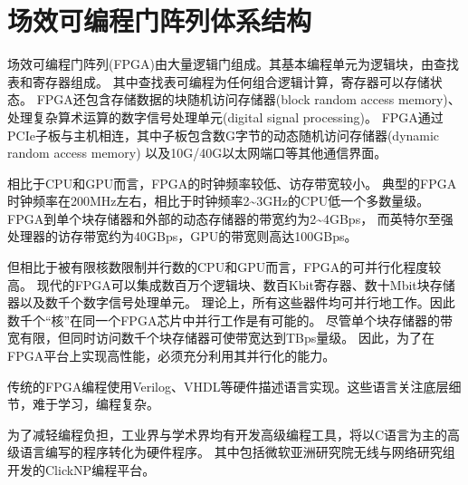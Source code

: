 \section{场效可编程门阵列体系结构}
场效可编程门阵列(FPGA)由大量逻辑门组成。其基本编程单元为逻辑块，由查找表和寄存器组成。
其中查找表可编程为任何组合逻辑计算，寄存器可以存储状态。
FPGA还包含存储数据的块随机访问存储器(block random access memory)、
处理复杂算术运算的数字信号处理单元(digital signal processing)。
FPGA通过PCIe子板与主机相连，其中子板包含数G字节的动态随机访问存储器(dynamic random access memory)
以及10G/40G以太网端口等其他通信界面。

相比于CPU和GPU而言，FPGA的时钟频率较低、访存带宽较小。
典型的FPGA时钟频率在200MHz左右，相比于时钟频率2\textasciitilde 3GHz的CPU低一个多数量级。
FPGA到单个块存储器和外部的动态存储器的带宽约为2\textasciitilde 4GBps，
而英特尔至强处理器的访存带宽约为40GBps，GPU的带宽则高达100GBps。

但相比于被有限核数限制并行数的CPU和GPU而言，FPGA的可并行化程度较高。
现代的FPGA可以集成数百万个逻辑块、数百Kbit寄存器、数十Mbit块存储器以及数千个数字信号处理单元。
理论上，所有这些器件均可并行地工作。因此数千个“核”在同一个FPGA芯片中并行工作是有可能的。
尽管单个块存储器的带宽有限，但同时访问数千个块存储器可使带宽达到TBps量级。
因此，为了在FPGA平台上实现高性能，必须充分利用其并行化的能力。

传统的FPGA编程使用Verilog、VHDL等硬件描述语言实现。这些语言关注底层细节，难于学习，编程复杂。

为了减轻编程负担，工业界与学术界均有开发高级编程工具，将以C语言为主的高级语言编写的程序转化为硬件程序。
其中包括微软亚洲研究院无线与网络研究组开发的ClickNP编程平台。
